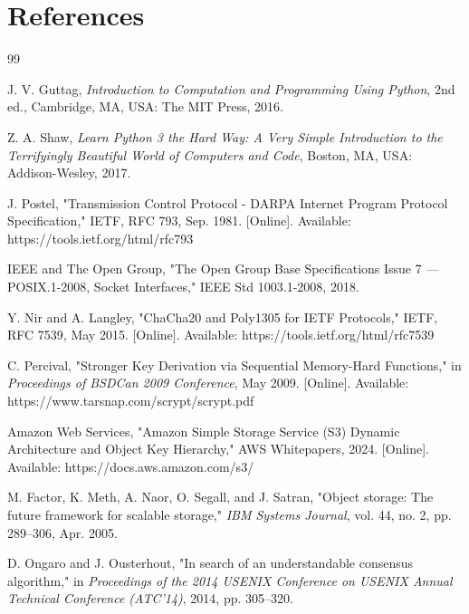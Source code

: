\section*{References}

\begin{thebibliography}{99}

J. V. Guttag, 
\textit{Introduction to Computation and Programming Using Python}, 
2nd ed., Cambridge, MA, USA: The MIT Press, 2016.

Z. A. Shaw, 
\textit{Learn Python 3 the Hard Way: A Very Simple Introduction to the Terrifyingly Beautiful World of Computers and Code}, 
Boston, MA, USA: Addison-Wesley, 2017.

J. Postel, 
"Transmission Control Protocol - DARPA Internet Program Protocol Specification," 
IETF, RFC 793, Sep. 1981. [Online]. Available: https://tools.ietf.org/html/rfc793

IEEE and The Open Group, 
"The Open Group Base Specifications Issue 7 --- POSIX.1-2008, Socket Interfaces," 
IEEE Std 1003.1-2008, 2018.

Y. Nir and A. Langley, 
"ChaCha20 and Poly1305 for IETF Protocols," 
IETF, RFC 7539, May 2015. [Online]. Available: https://tools.ietf.org/html/rfc7539

C. Percival, 
"Stronger Key Derivation via Sequential Memory-Hard Functions," 
in \textit{Proceedings of BSDCan 2009 Conference}, 
May 2009. [Online]. Available: https://www.tarsnap.com/scrypt/scrypt.pdf

Amazon Web Services, 
"Amazon Simple Storage Service (S3) Dynamic Architecture and Object Key Hierarchy," 
AWS Whitepapers, 2024. [Online]. Available: https://docs.aws.amazon.com/s3/

M. Factor, K. Meth, A. Naor, O. Segall, and J. Satran, 
"Object storage: The future framework for scalable storage," 
\textit{IBM Systems Journal}, vol. 44, no. 2, pp. 289--306, Apr. 2005.

D. Ongaro and J. Ousterhout, 
"In search of an understandable consensus algorithm," 
in \textit{Proceedings of the 2014 USENIX Conference on USENIX Annual Technical Conference (ATC'14)}, 
2014, pp. 305--320.


\end{thebibliography}

